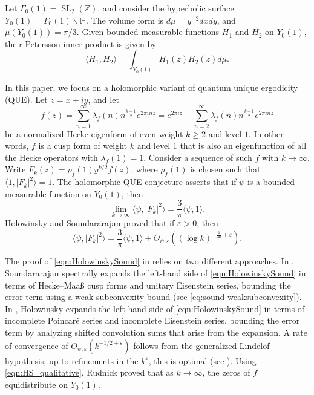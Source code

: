 \documentclass[12pt,reqno]{amsart}
\theoremstyle{remark}
\newcommand{\z}{\mathbb{Z}}
\newcommand{\h}{\mathbb{H}}
\newcommand{\bs}{\backslash}
\DeclareMathOperator{\SL}{SL}
\numberwithin{equation}{section}
\begin{document}
\label{sec:intro}

    Let $\Gamma_0(1) = \SL_2(\z)$, and consider the hyperbolic surface $Y_0(1) = \Gamma_0(1)\bs\h$. The volume form is $d\mu = y^{-2}dxdy$, and $\mu(Y_0(1))=\pi/3$. Given bounded measurable functions $H_1$ and $H_2$ on $Y_0(1)$, their Petersson inner product is given by
    \[
        \langle H_1, H_2 \rangle = \int_{Y_0(1)} H_1(z) \overline{H_2(z)} d\mu.
    \]
    
    In this paper, we focus on a holomorphic variant of  quantum unique ergodicity (QUE).  
    Let $z= x+iy$, and let 
    \[
        f(z) = \sum_{n=1}^{\infty}\lambda_f(n)n^{\frac{k-1}{2}}e^{2\pi i n z} = e^{2\pi i z}+\sum_{n=2}^{\infty}\lambda_f(n)n^{\frac{k-1}{2}}e^{2\pi i n z}
    \]
    be a normalized Hecke eigenform of even weight $k\geq 2$ and level $1$. In other words, $f$ is a cusp form of weight $k$ and level $1$ that is also an eigenfunction of all the Hecke operators with $\lambda_f(1) = 1$.  
    Consider a sequence of such $f$ with $k\to\infty$. 
    Write $F_k(z) = \rho_f(1)y^{k/2}f(z)$, where $\rho_f(1)$ is chosen such that $\langle 1, |F_k|^2 \rangle = 1$. The holomorphic QUE conjecture asserts that if $\psi$ is a bounded measurable function on  $Y_0(1)$, then
    \begin{equation}
	\label{eqn:HS_qualitative}
            \lim_{k \to \infty}   \langle \psi,|F_k|^2 \rangle = \frac{3}{\pi} \langle \psi, 1\rangle.
    \end{equation}
    Holowinsky and Soundararajan \cite{H,HS,S}  proved that if $\varepsilon>0$, then
    \begin{equation}
	\label{eqn:HolowinskySound}
            \langle \psi, |F_k|^2 \rangle = \frac{3}{\pi}\langle \psi, 1\rangle +O_{\psi, \varepsilon}((\log k)^{-\frac{1}{30}+\varepsilon}).
    \end{equation}
    
    The proof of \eqref{eqn:HolowinskySound} in \cite{HS} relies on two different approaches.  In \cite{S}, Soundararajan spectrally expands the left-hand side of \eqref{eqn:HolowinskySound} in terms of Hecke--Maa{\ss} cusp forms and unitary Eisenstein series, bounding the error term using a weak subconvexity bound (see \eqref{eq:sound-weaksubconvexity}).  In \cite{H}, Holowinsky expands the left-hand side of \eqref{eqn:HolowinskySound} in terms of incomplete Poincar{\'e} series and 
    incomplete Eisenstein series, bounding the error term by analyzing shifted convolution sums that arise from the expansion.  A rate of convergence of $O_{\psi,\varepsilon}(k^{-1/2+\varepsilon})$ follows from the generalized Lindel{\"o}f hypothesis; up to refinements in the $k^{\varepsilon}$, this is optimal (see \cite{IS}). Using \eqref{eqn:HS_qualitative}, Rudnick \cite{Ru} proved that as $k\to\infty$, the zeros of $f$ equidistribute on $Y_0(1)$.
	
\end{document}
